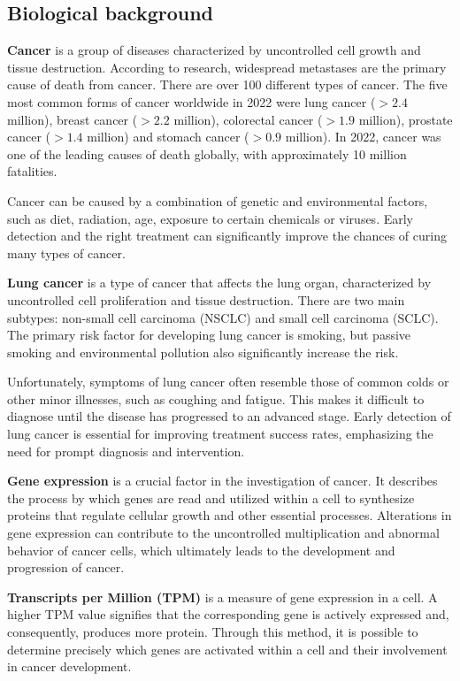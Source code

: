 \subsection{Biological background} \label{subsec:biological_background}
\textbf{Cancer} is a group of diseases characterized by uncontrolled cell growth and tissue destruction.
According to research, widespread metastases are the primary cause of death from cancer\cite{who_cancer_fact_sheet}.
There are over 100 different types of cancer\cite{nci_cancer_types}.
The five most common forms of cancer worldwide in 2022 were lung cancer ($>2.4$ million),
breast cancer ($>2.2$ million), colorectal cancer ($>1.9$ million), prostate cancer ($>1.4$ million) and
stomach cancer ($>0.9$ million).
In 2022, cancer was one of the leading causes of death globally,
with approximately 10 million fatalities\cite{ferlay2024global}.

Cancer can be caused by a combination of genetic and environmental factors,
such as diet, radiation, age, exposure to certain chemicals or viruses\cite{nci_cancer_risk}.
Early detection and the right treatment can significantly improve the chances of curing many types of cancer.

\textbf{Lung cancer} is a type of cancer that affects the lung organ,
characterized by uncontrolled cell proliferation and tissue destruction.
There are two main subtypes: non-small cell carcinoma (NSCLC) and small cell carcinoma (SCLC)\cite{nci_lung_cancer_types}.
The primary risk factor for developing lung cancer is smoking,
but passive smoking and environmental pollution also significantly increase the risk.

Unfortunately, symptoms of lung cancer often resemble those of common colds or other minor illnesses,
such as coughing and fatigue.
This makes it difficult to diagnose until the disease has progressed to an advanced stage\cite{who_lung_cancer}.
Early detection of lung cancer is essential for improving treatment success rates,
emphasizing the need for prompt diagnosis and intervention.

\textbf{Gene expression} is a crucial factor in the investigation of cancer.
It describes the process by which genes are read and utilized within a cell to synthesize proteins
that regulate cellular growth and other essential processes.
Alterations in gene expression can contribute to the uncontrolled multiplication and abnormal behavior of cancer cells,
which ultimately leads to the development and progression of cancer.

\textbf{Transcripts per Million (TPM)} is a measure of gene expression in a cell.
A higher TPM value signifies that the corresponding gene is actively expressed and, consequently, produces more protein.
Through this method, it is possible to determine precisely which genes are activated within a cell and
their involvement in cancer development.